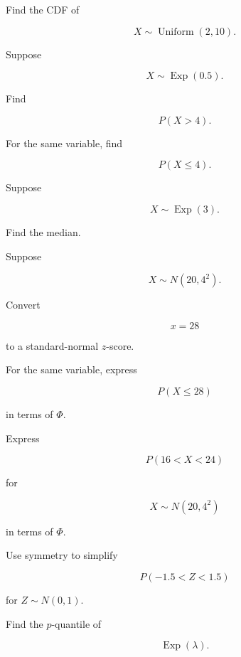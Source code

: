 \begin{exercise}[2]
Find the CDF of

\[
X\sim\operatorname{Uniform}(2,10).
\]
\end{exercise}

\begin{exercise}[2]
Suppose

\[
X\sim\operatorname{Exp}(0.5).
\]

Find

\[
P(X>4).
\]
\end{exercise}

\begin{exercise}[2]
For the same variable, find

\[
P(X\leq4).
\]
\end{exercise}

\begin{exercise}[2]
Suppose

\[
X\sim\operatorname{Exp}(3).
\]

Find the median.
\end{exercise}

\begin{exercise}[2]
Suppose

\[
X\sim N(20,4^2).
\]

Convert

\[
x=28
\]

to a standard-normal \(z\)-score.
\end{exercise}

\begin{exercise}[2]
For the same variable, express

\[
P(X\leq28)
\]

in terms of \(\Phi\).
\end{exercise}

\begin{exercise}[2]
Express

\[
P(16<X<24)
\]

for

\[
X\sim N(20,4^2)
\]

in terms of \(\Phi\).
\end{exercise}

\begin{exercise}[2]
Use symmetry to simplify

\[
P(-1.5<Z<1.5)
\]

for \(Z\sim N(0,1)\).
\end{exercise}

\begin{exercise}[2]
Find the \(p\)-quantile of

\[
\operatorname{Exp}(\lambda).
\]
\end{exercise}

